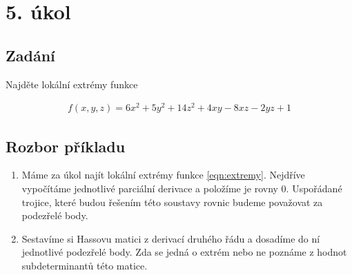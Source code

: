 \section{5. úkol}
\subsection*{Zadání}
Najděte lokální extrémy funkce 

\begin{eqnarray}
f(x,y,z) = 6x^2 + 5y^2 + 14z^2 + 4xy - 8xz - 2yz +1
\label{eqn:extremy}
\end{eqnarray}

\subsection*{Rozbor příkladu}
\begin{enumerate}
	\item Máme za úkol najít lokální extrémy funkce \ref{eqn:extremy}. Nejdříve vypočítáme jednotlivé parciální derivace a položíme je rovny $0$. Uspořádané trojice, které budou řešením této soustavy rovnic budeme považovat za podezřelé body.

	\item Sestavíme si Hassovu matici z derivací druhého řádu a dosadíme do ní jednotlivé podezřelé body. Zda se jedná o extrém nebo ne poznáme z hodnot subdeterminantů této matice.
\end{enumerate}


